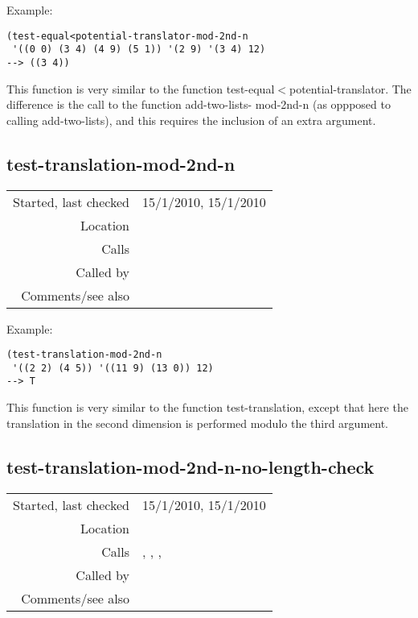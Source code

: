 \vspace{0.5cm}
\noindent Example:
\begin{verbatim}
(test-equal<potential-translator-mod-2nd-n
 '((0 0) (3 4) (4 9) (5 1)) '(2 9) '(3 4) 12)
--> ((3 4))
\end{verbatim}

\noindent This function is very similar to the
function test-equal$<$potential-translator. The
difference is the call to the function add-two-lists-
mod-2nd-n (as oppposed to calling add-two-lists), and
this requires the inclusion of an extra argument.


\subsection*{test-translation-mod-2nd-n}\label{fun:test-translation-mod-2nd-n}

\vspace{0.3cm}
\begin{tabular}{r|p{8cm}}
Started, last checked & 15/1/2010, 15/1/2010 \\
Location & \nameref{sec:structural-induction-mod} \\
Calls & \nameref{fun:test-translation-mod-2nd-n-no-length-check} \\
Called by & \\
Comments/see also & \nameref{fun:test-translation}
\end{tabular}

\vspace{0.5cm}
\noindent Example:
\begin{verbatim}
(test-translation-mod-2nd-n
 '((2 2) (4 5)) '((11 9) (13 0)) 12)
--> T
\end{verbatim}

\noindent This function is very similar to the
function test-translation, except that here the
translation in the second dimension is performed
modulo the third argument.


\subsection*{test-translation-mod-2nd-n-no-length-check}\label{fun:test-translation-mod-2nd-n-no-length-check}

\vspace{0.3cm}
\begin{tabular}{r|p{8cm}}
Started, last checked & 15/1/2010, 15/1/2010 \\
Location & \nameref{sec:structural-induction-mod} \\
Calls & \nameref{fun:mod-column}, \nameref{fun:sort-dataset-asc}, \nameref{fun:subtract-two-lists-mod-2nd-n}, \nameref{fun:translation-mod-2nd-n} \\
Called by & \nameref{fun:test-translation-mod-2nd-n} \\
Comments/see also & \nameref{fun:test-translation-no-length-check}
\end{tabular}

